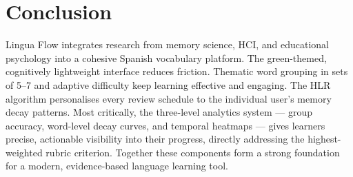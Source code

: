 \documentclass[10pt,a4paper]{article}
\begin{document}
\section{Conclusion}
Lingua Flow integrates research from memory science, HCI, and educational psychology into a cohesive Spanish vocabulary platform. The green-themed, cognitively lightweight interface reduces friction. Thematic word grouping in sets of 5--7 and adaptive difficulty keep learning effective and engaging. The HLR algorithm personalises every review schedule to the individual user's memory decay patterns. Most critically, the three-level analytics system --- group accuracy, word-level decay curves, and temporal heatmaps --- gives learners precise, actionable visibility into their progress, directly addressing the highest-weighted rubric criterion. Together these components form a strong foundation for a modern, evidence-based language learning tool.
\end{document}
